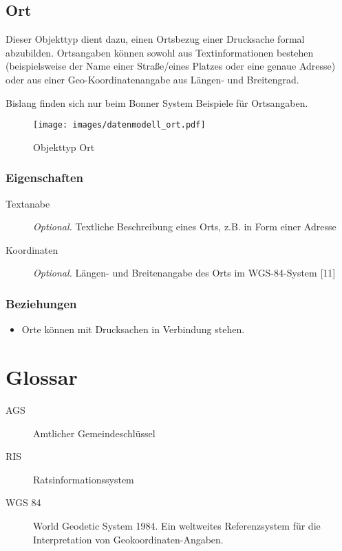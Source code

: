 \documentclass[,a4paper]{article}
\makeatletter
\def\maxwidth{\ifdim\Gin@nat@width>\linewidth\linewidth
\else\Gin@nat@width\fi}
\let\Oldincludegraphics\includegraphics
\renewcommand{\includegraphics}[1]{\Oldincludegraphics[width=\maxwidth]{#1}}
\makeatother
\begin{document}
\subsection{Ort}

Dieser Objekttyp dient dazu, einen Ortsbezug einer Drucksache formal
abzubilden. Ortsangaben können sowohl aus Textinformationen bestehen
(beispielsweise der Name einer Straße/eines Platzes oder eine genaue
Adresse) oder aus einer Geo-Koordinatenangabe aus Längen- und
Breitengrad.

Bislang finden sich nur beim Bonner System Beispiele für Ortsangaben.

\begin{figure}[htbp]
\centering
\texttt{[image: images/datenmodell\_ort.pdf]}
\caption{Objekttyp Ort}
\end{figure}

\subsubsection{Eigenschaften}

\begin{description}
\item[Textanabe]
\emph{Optional.} Textliche Beschreibung eines Orts, z.B. in Form einer
Adresse
\item[Koordinaten]
\emph{Optional.} Längen- und Breitenangabe des Orts im WGS-84-System
{[}11{]}
\end{description}

\subsubsection{Beziehungen}

\begin{itemize}
\item
  Orte können mit Drucksachen in Verbindung stehen.
\end{itemize}

\section{Glossar}

\begin{description}
\item[AGS]
Amtlicher Gemeindeschlüssel
\item[RIS]
Ratsinformationssystem
\item[WGS 84]
World Geodetic System 1984. Ein weltweites Referenzsystem für die
Interpretation von Geokoordinaten-Angaben.
\end{description}
\end{document}
